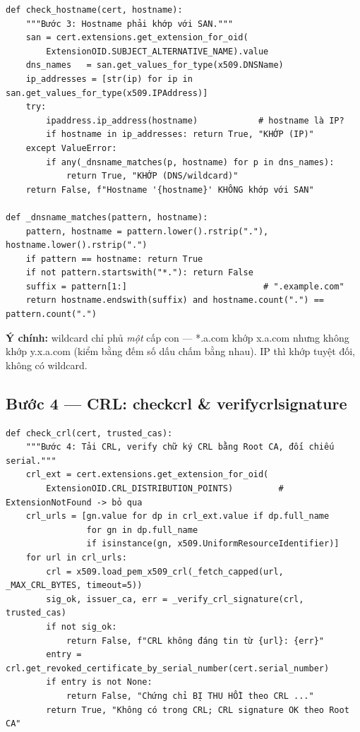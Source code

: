 \documentclass[12pt,a4paper]{article}
\newcommand{\code}[1]{{\ttfamily\small\def\_{\textunderscore\discretionary{}{}{}}#1}}
\begin{document}
\begin{Verbatim}
def check_hostname(cert, hostname):
    """Bước 3: Hostname phải khớp với SAN."""
    san = cert.extensions.get_extension_for_oid(
        ExtensionOID.SUBJECT_ALTERNATIVE_NAME).value
    dns_names   = san.get_values_for_type(x509.DNSName)
    ip_addresses = [str(ip) for ip in san.get_values_for_type(x509.IPAddress)]
    try:
        ipaddress.ip_address(hostname)            # hostname là IP?
        if hostname in ip_addresses: return True, "KHỚP (IP)"
    except ValueError:
        if any(_dnsname_matches(p, hostname) for p in dns_names):
            return True, "KHỚP (DNS/wildcard)"
    return False, f"Hostname '{hostname}' KHÔNG khớp với SAN"

def _dnsname_matches(pattern, hostname):
    pattern, hostname = pattern.lower().rstrip("."), hostname.lower().rstrip(".")
    if pattern == hostname: return True
    if not pattern.startswith("*."): return False
    suffix = pattern[1:]                           # ".example.com"
    return hostname.endswith(suffix) and hostname.count(".") == pattern.count(".")
\end{Verbatim}

\textbf{Ý chính:} wildcard chỉ phủ \emph{một} cấp con --- \code{*.a.com} khớp
\code{x.a.com} nhưng không khớp \code{y.x.a.com} (kiểm bằng đếm số dấu chấm bằng
nhau). IP thì khớp tuyệt đối, không có wildcard.

\subsection{Bước 4 --- CRL: \code{check\_crl} \& \code{\_verify\_crl\_signature}}

\begin{Verbatim}
def check_crl(cert, trusted_cas):
    """Bước 4: Tải CRL, verify chữ ký CRL bằng Root CA, đối chiếu serial."""
    crl_ext = cert.extensions.get_extension_for_oid(
        ExtensionOID.CRL_DISTRIBUTION_POINTS)         # ExtensionNotFound -> bỏ qua
    crl_urls = [gn.value for dp in crl_ext.value if dp.full_name
                for gn in dp.full_name
                if isinstance(gn, x509.UniformResourceIdentifier)]
    for url in crl_urls:
        crl = x509.load_pem_x509_crl(_fetch_capped(url, _MAX_CRL_BYTES, timeout=5))
        sig_ok, issuer_ca, err = _verify_crl_signature(crl, trusted_cas)
        if not sig_ok:
            return False, f"CRL không đáng tin từ {url}: {err}"
        entry = crl.get_revoked_certificate_by_serial_number(cert.serial_number)
        if entry is not None:
            return False, "Chứng chỉ BỊ THU HỒI theo CRL ..."
        return True, "Không có trong CRL; CRL signature OK theo Root CA"
\end{Verbatim}
\end{document}
